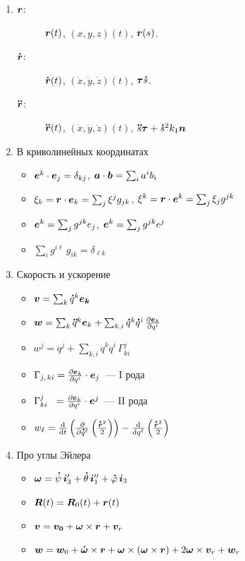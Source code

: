 \documentclass[final,landscape,hardcopy]{notes}
\begin{document}
\begin{multicols*}{4} \raggedright
\begin{enumerate}
  \item 
    \begin{description}
      \item[$\v r$:] $\v r(t)$, $(x,y,z)(t)$, $\v r(s)$.
      \item[$\dot{\v r}$:] $\dot{\v r}(t)$, $(\dot x,\dot y,\dot z)(t)$, $\v\tau \dot s$.
      \item[$\ddot{\v r}$:] $\ddot{\v r}(t)$, $(\ddot x,\ddot y,\ddot z)(t)$,
        $\ddot s \v \tau + \dot s^2 k_1 \v n$
    \end{description}
  \item В криволинейных координатах
    \begin{itemize}
      \item $\v e^k \cdot \v e_j = \delta_{kj} $, $\v a \cdot \v b = \sum_i a^i b_i $
      \item $\xi_k = \v r\cdot \v e_k = \sum_j \xi^j g_{jk}$,
        $\xi^k = \v r\cdot \v e^k = \sum_j \xi_j g^{jk}$
      \item $\v e^k = \sum_j g^{jk} e_j$, $\v e^k = \sum_j g^{jk} e^j$
      \item $\sum_i g^{i\ell}\, g_{ik} = \delta_{\ell k}$
    \end{itemize}
  \item Скорость и ускорение 
    \begin{itemize}[$\triangleright$]
      \item $\v v = \sum_k \dot q^k \v {e_k}$
      \item $\v w = \sum_k \ddot q^k \v e_k + \sum_{k,i} \dot q^k \dot q^i \, \pder{\v e_k}{q^i}$
      \item ${w^j} = \ddot q^j + \sum_{k,i} \dot q^k \dot q^i \, \Gamma_{ki}^j$
      \item $ \Gamma_{j,\,ki} = \pder{\v e_k }{q^i}\cdot \v e_j$~--- I рода
      \item $ \Gamma_{ki}^j \;\,\,= \pder{\v e_k }{q^i}\cdot \v e^j$~--- II рода
      \item $w_\ell = 
        \fder{}{t} \left(\pder{}{\dot q^\ell}\left(\frac{\dot{\v r}^2}{2}\right)\right) 
        - \fder{}{q^\ell} \left(\frac{\dot{\v r}^2}{2}\right)$
    \end{itemize}
  \item Про углы Эйлера \\
    \noindent

    \begin{itemize}[$\triangleright$]
      \item $\v \omega = \dot\psi\,\v i_3'  + \dot\theta\,\v i_1''  + \dot\varphi\,\v i_3  $
      \item $\v R (t) = \v R_0  (t) + \v r(t)$
      \item $\v v = \v {v_0} + \v \omega \times \v r  + \v v_r $
      \item $\v w = \v w_0 + \dot{\v \omega} \times \v r 
        + \v \omega \times (\v \omega \times \v r) + 2 \v \omega \times \v v_r  + \v w_r $
    \end{itemize}
    

\end{enumerate}
\end{multicols*}
\end{document}
